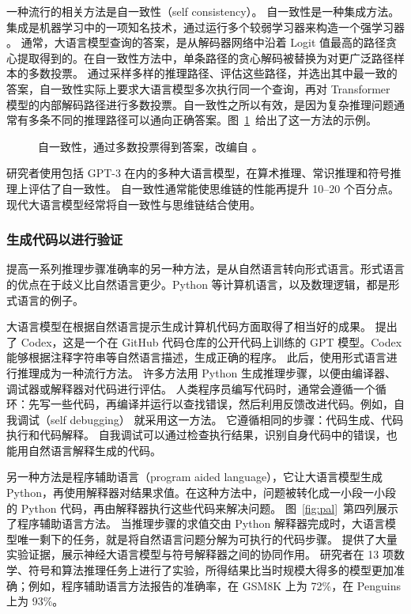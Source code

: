 一种流行的相关方法是自一致性（self consistency）\citep{wang2022self}。\label{selfconsistency}
自一致性是一种集成方法。集成是机器学习中的一项知名技术，通过运行多个较弱学习器来构造一个强学习器 \citep{sagi2018ensemble,breiman2001random}。
通常，大语言模型查询的答案，是从解码器网络中沿着 Logit 值最高的路径贪心提取得到的。在自一致性方法中，单条路径的贪心解码被替换为对更广泛路径样本的多数投票。
通过采样多样的推理路径、评估这些路径，并选出其中最一致的答案，自一致性实际上要求大语言模型多次执行同一个查询，再对 Transformer 模型的内部解码路径进行多数投票。自一致性之所以有效，是因为复杂推理问题通常有多条不同的推理路径可以通向正确答案。图~\ref{fig:sc}~给出了这一方法的示例。
\begin{figure}
  \begin{center}
    
    \caption{自一致性，通过多数投票得到答案，改编自 \citep{wang2022self}。}\label{fig:sc}
  \end{center}
\end{figure}

研究者使用包括 GPT-3 在内的多种大语言模型，在算术推理、常识推理和符号推理上评估了自一致性。
自一致性通常能使思维链的性能再提升 10--20 个百分点。现代大语言模型经常将自一致性与思维链结合使用。

\subsubsection{生成代码以进行验证}\label{sec:selfdebug}

提高一系列推理步骤准确率的另一种方法，是从自然语言转向形式语言。形式语言的优点在于歧义比自然语言更少。Python 等计算机语言，以及数理逻辑，都是形式语言的例子。

大语言模型在根据自然语言提示生成计算机代码方面取得了相当好的成果。
\citet{chen2021evaluating} 提出了 Codex，这是一个在 GitHub 代码仓库的公开代码上训练的 GPT 模型。Codex 能够根据注释字符串等自然语言描述，生成正确的程序。
此后，使用形式语言进行推理成为一种流行方法。
许多方法用 Python 生成推理步骤，以便由编译器、调试器或解释器对代码进行评估。
人类程序员编写代码时，通常会遵循一个循环：先写一些代码，再编译并运行以查找错误，然后利用反馈改进代码。例如，自我调试（self debugging）\citep{chen2023teaching} 就采用这一方法。
它遵循相同的步骤：代码生成、代码执行和代码解释。
自我调试可以通过检查执行结果，识别自身代码中的错误，也能用自然语言解释生成的代码。

另一种方法是程序辅助语言（program aided language）\citep{gao2023pal}，它让大语言模型生成 Python，再使用解释器对结果求值。在这种方法中，问题被转化成一小段一小段的 Python 代码，再由解释器执行这些代码来解决问题。
图~\ref{fig:pal}~第四列展示了程序辅助语言方法。
当推理步骤的求值交由 Python 解释器完成时，大语言模型唯一剩下的任务，就是将自然语言问题分解为可执行的代码步骤。
\citet{gao2023pal} 提供了大量实验证据，展示神经大语言模型与符号解释器之间的协同作用。
研究者在 13 项数学、符号和算法推理任务上进行了实验，所得结果比当时规模大得多的模型更加准确；例如，程序辅助语言方法报告的准确率，在 GSM8K 上为 72\%，在 Penguins 上为 93\%。

